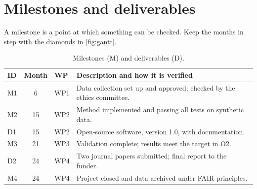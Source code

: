\documentclass[11pt,a4paper,parskip=half-]{scrartcl}
\begin{document}
\section{Milestones and deliverables}
A milestone is a point at which something can be checked. Keep the months in step with
the diamonds in \cref{fig:gantt}.

\begin{table}[ht]
  \centering
  \caption{Milestones (M) and deliverables (D).}
  \label{tab:milestones}
  \begin{tabularx}{\textwidth}{@{}l c l X@{}}
    \toprule
    ID & Month & WP & Description and how it is verified \\
    \midrule
    M1 & 6  & WP1 & Data collection set up and approved; checked by the ethics committee. \\
    M2 & 15 & WP2 & Method implemented and passing all tests on synthetic data. \\
    D1 & 15 & WP2 & Open-source software, version 1.0, with documentation. \\
    M3 & 21 & WP3 & Validation complete; results meet the target in O2. \\
    D2 & 24 & WP4 & Two journal papers submitted; final report to the funder. \\
    M4 & 24 & WP4 & Project closed and data archived under FAIR principles. \\
    \bottomrule
  \end{tabularx}
\end{table}

\end{document}
